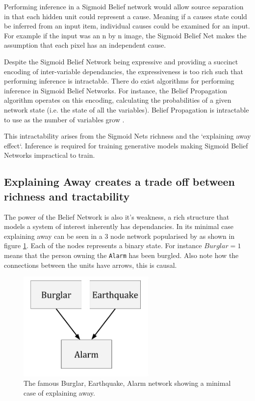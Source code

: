     Performing inference in a Sigmoid Belief network would allow source separation in that each hidden unit could represent a cause. Meaning if a causes state could be inferred from an input item, individual causes could be examined for an input. For example if the input was an n by n image, the Sigmoid Belief Net makes the assumption that each pixel has an independent cause.

    Despite the Sigmoid Belief Network being expressive and providing a succinct encoding of inter-variable dependancies, the expressiveness is too rich such that performing inference is intractable. There do exist algorithms for performing inference in Sigmoid Belief Networks. For instance, the Belief Propagation algorithm  operates on this encoding, calculating the probabilities of a given network state (i.e. the state of all the variables).  Belief Propagation is intractable to use as the number of variables grow .

    This intractability arises from the Sigmoid Nets richness and the `explaining away effect`. Inference is required for training generative models making Sigmoid Belief Networks impractical to train. 

    \subsection{Explaining Away creates a trade off between richness and tractability}
    \todo%
    The power of the Belief Network is also it's weakness, a rich structure that models a system of interest inherently has dependancies. In its minimal case explaining away can be seen in a 3 node network popularised by  as shown in figure \ref{F:Explaining-Away}. Each of the nodes represents a binary state. For instance $Burglar = 1$ means that the person owning the \texttt{Alarm} has been burgled. Also note how the connections between the units have arrows, this is causal.

    \begin{figure}[h]
    \begin{center}
      \includegraphics[width = 0.6\textwidth]{Assets/Explaining_Away.png}
    \caption{The famous Burglar, Earthquake, Alarm network showing a minimal case of explaining away.}
    \label{F:Explaining-Away}
    \end{center}
    \end{figure}


